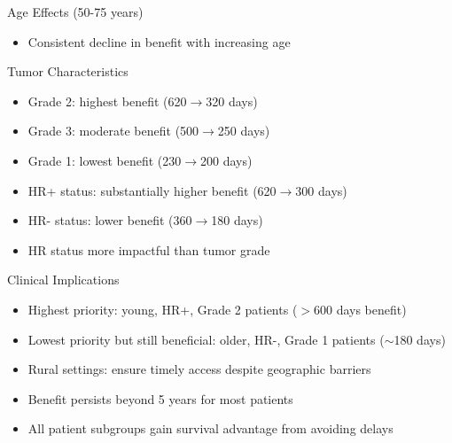 \documentclass{beamer}
\begin{document}
    \begin{frame}{}
    
   
    
    \begin{block}{Age Effects (50-75 years)}
    \begin{itemize}
    \item Consistent decline in benefit with increasing age
    \end{itemize}
    \end{block}
    
    \begin{block}{Tumor Characteristics}
    \begin{itemize}
    \item Grade 2: highest benefit (620$\rightarrow$320 days)
    \item Grade 3: moderate benefit (500$\rightarrow$250 days)
    \item Grade 1: lowest benefit (230$\rightarrow$200 days)
    \item HR+ status: substantially higher benefit (620$\rightarrow$300 days)
    \item HR- status: lower benefit (360$\rightarrow$180 days)
   \item HR status more impactful than tumor grade
    \end{itemize}
    \end{block}
    
    \begin{block}{Clinical Implications}
    \begin{itemize}
    \item Highest priority: young, HR+, Grade 2 patients ($>$600 days benefit)
    \item Lowest priority but still beneficial: older, HR-, Grade 1 patients ($\sim$180 days)
    \item Rural settings: ensure timely access despite geographic barriers
    \item Benefit persists beyond 5 years for most patients
    \item All patient subgroups gain survival advantage from avoiding delays
    \end{itemize}
    \end{block}
    
   
    \end{frame}
\end{document}
